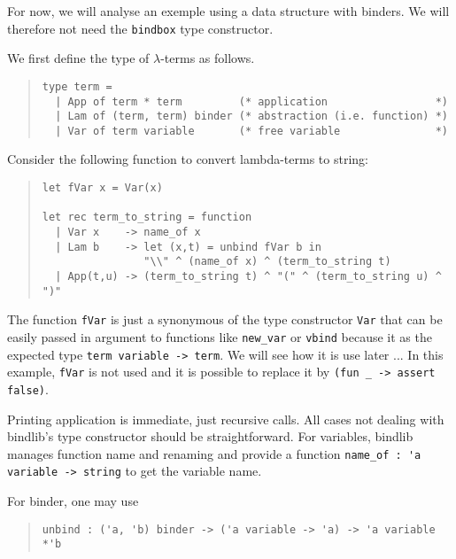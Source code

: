 \documentclass[11pt]{article}
\begin{document}
For now, we will analyse an exemple using a data structure with
binders. We will therefore not need the \verb#bindbox# type constructor.

We first define the type of $\lambda$-terms as follows.
\begin{quote}
\begin{verbatim}
type term =
  | App of term * term         (* application                 *)
  | Lam of (term, term) binder (* abstraction (i.e. function) *)
  | Var of term variable       (* free variable               *)
\end{verbatim}
\end{quote}

Consider the following function to convert lambda-terms to string:

\begin{quote}
\begin{verbatim}
let fVar x = Var(x)

let rec term_to_string = function
  | Var x    -> name_of x
  | Lam b    -> let (x,t) = unbind fVar b in
                "\\" ^ (name_of x) ^ (term_to_string t)
  | App(t,u) -> (term_to_string t) ^ "(" ^ (term_to_string u) ^ ")"
\end{verbatim}
\end{quote}

The function \verb!fVar! is just a synonymous of the type constructor
\verb!Var! that can be easily passed in argument to functions like
\verb#new_var# or \verb#vbind# because it as the expected type
\verb#term variable -> term#. We will see how it is use later ...
In this example, \verb!fVar! is not used and it is possible to
replace it by \verb!(fun _ -> assert false)!.

Printing application is immediate, just recursive calls. All cases not
dealing with bindlib's type constructor should be straightforward. For
variables, bindlib manages function name and renaming and provide a
function \verb!name_of : 'a variable -> string! to get the variable name.

For binder, one may use
\begin{quote}
\begin{verbatim}
unbind : ('a, 'b) binder -> ('a variable -> 'a) -> 'a variable *'b
\end{verbatim}
\end{quote}
\end{document}
